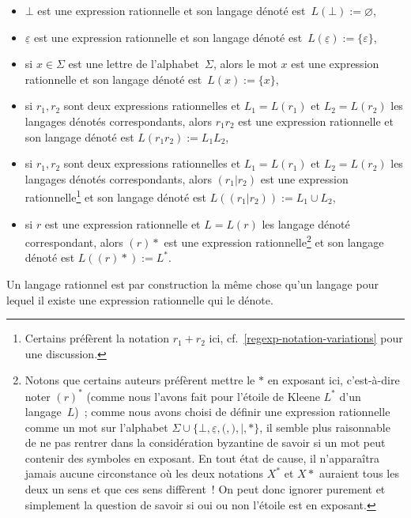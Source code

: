 \documentclass[12pt,a4paper]{article}
\theoremstyle{definition}
\begin{document}
\begin{itemize}
\item $\bot$ est une expression rationnelle et son langage dénoté
  est $L(\bot) := \varnothing$,
\item $\underline{\varepsilon}$ est une expression rationnelle et son
  langage dénoté est $L(\underline{\varepsilon}) :=
  \{\varepsilon\}$,
\item si $x\in\Sigma$ est une lettre de l'alphabet $\Sigma$, alors le
  mot $x$ est une expression rationnelle et son langage dénoté
  est $L(x) := \{x\}$,
\item si $r_1,r_2$ sont deux expressions rationnelles et $L_1 =
  L(r_1)$ et $L_2 = L(r_2)$ les langages dénotés correspondants,
  alors $r_1 r_2$ est une expression rationnelle et son langage
  dénoté est $L(r_1 r_2) := L_1 L_2$,
\item si $r_1,r_2$ sont deux expressions rationnelles et $L_1 =
  L(r_1)$ et $L_2 = L(r_2)$ les langages dénotés correspondants,
  alors $(r_1|r_2)$ est une expression rationnelle\footnote{Certains
    préfèrent la notation $r_1+r_2$ ici,
    cf. \ref{regexp-notation-variations} pour une discussion.} et son
  langage dénoté est $L((r_1|r_2)) := L_1\cup L_2$,
\item si $r$ est une expression rationnelle et $L = L(r)$ les langage
  dénoté correspondant, alors $(r){*}$ est une expression
  rationnelle\footnote{Notons que certains auteurs préfèrent mettre le
    $*$ en exposant ici, c'est-à-dire noter $(r)^*$ (comme nous
    l'avons fait pour l'étoile de Kleene $L^*$ d'un langage $L$) ;
    comme nous avons choisi de définir une expression rationnelle
    comme un mot sur l'alphabet $\Sigma \cup \{\bot,
    \underline{\varepsilon}, {(}, {)}, {|}, {*}\}$, il semble plus
    raisonnable de ne pas rentrer dans la considération byzantine de
    savoir si un mot peut contenir des symboles en exposant.  En tout
    état de cause, il n'apparaîtra jamais aucune circonstance où les
    deux notations $X^*$ et $X{*}$ auraient tous les deux un sens et
    que ces sens diffèrent !  On peut donc ignorer purement et
    simplement la question de savoir si oui ou non l'étoile est en
    exposant.} et son langage dénoté est $L((r){*}) := L^*$.
\end{itemize}

Un langage rationnel est par construction la même chose qu'un langage
pour lequel il existe une expression rationnelle qui le dénote.
\end{document}
